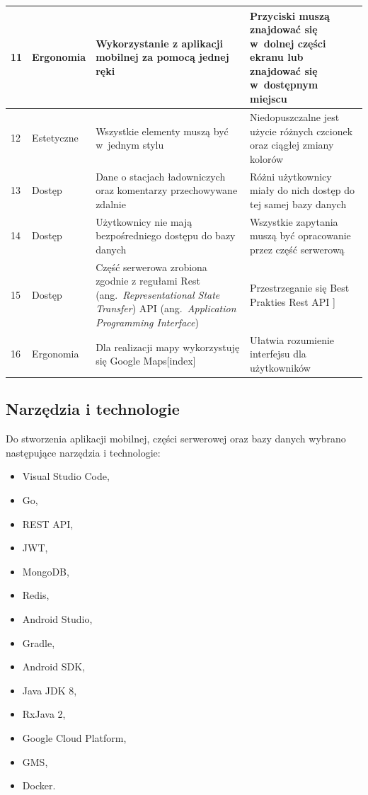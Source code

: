 \begin{table}[htb]
\begin{tabularx}{\linewidth}{| l| l |X | X |}
    \hline
    11 & Ergonomia & Wykorzystanie z aplikacji mobilnej za pomocą jednej ręki & Przyciski muszą znajdować się w~dolnej części ekranu lub znajdować się w~dostępnym miejscu \\
    \hline
    12 & Estetyczne & Wszystkie elementy muszą być w~jednym stylu & Niedopuszczalne jest użycie różnych czcionek oraz ciągłej zmiany kolorów \\
    \hline
    13 & Dostęp & Dane o stacjach ładowniczych oraz komentarzy przechowywane zdalnie & Różni użytkownicy miały do nich dostęp do tej samej bazy danych \\
    \hline
    14 & Dostęp & Użytkownicy nie mają bezpośredniego dostępu do bazy danych & Wszystkie zapytania muszą być opracowanie przez część serwerową \\
    \hline
    15 & Dostęp & Część serwerowa zrobiona zgodnie z regułami Rest (ang.~\emph{Representational State Transfer}) API (ang.~\emph{Application Programming Interface}) & Przestrzeganie się Best Prakties Rest API \cite{rest_api_best}] \\
    \hline
    16 & Ergonomia & Dla realizacji mapy wykorzystuję się Google Maps[index] & Ułatwia rozumienie interfejsu dla użytkowników \\
    \hline
\end{tabularx}
\end{table}
\newpage
\subsection{Narzędzia i technologie}
Do stworzenia aplikacji mobilnej, części serwerowej oraz bazy danych wybrano następujące narzędzia i technologie:
\begin{multicols}{3}
\begin{itemize}
    \item Visual Studio Code,
    \item Go,
    \item REST API,
    \item JWT,
    \item MongoDB,
    \item Redis,
    \item Android Studio,
    \item Gradle,
    \item Android SDK,
    \item Java JDK 8,
    \item RxJava 2,
    \item Google Cloud Platform,
    \item GMS,
    \item Docker.
\end{itemize}
\end{multicols}


